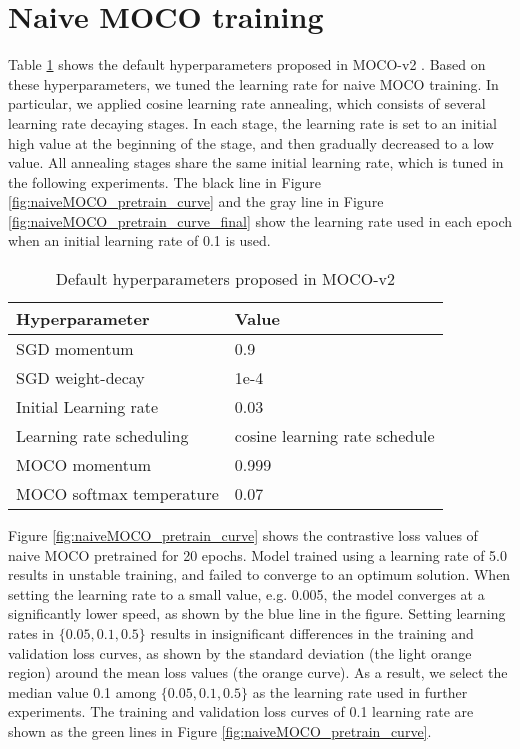 \documentclass[12pt,twoside]{report}
\begin{document}
\section{Naive MOCO training} \label{sec:naiveMOCO_eval}
Table \ref{tab:naive_moco_hyperparameters} shows the default hyperparameters proposed in MOCO-v2 \cite{mocov2}. Based on these hyperparameters, we tuned the learning rate for naive MOCO training. In particular, we applied cosine learning rate annealing, which consists of several learning rate decaying stages. In each stage, the learning rate is set to an initial high value at the beginning of the stage, and then gradually decreased to a low value. All annealing stages share the same initial learning rate, which is tuned in the following experiments. The black line in Figure \ref{fig:naiveMOCO_pretrain_curve} and the gray line in Figure \ref{fig:naiveMOCO_pretrain_curve_final} show the learning rate used in each epoch when an initial learning rate of 0.1 is used. \\

\begin{table}[]
    \centering
    \begin{tabular}{ll}
    \toprule
    Hyperparameter & Value \\
    \midrule
    SGD momentum & 0.9 \\
    SGD weight-decay & 1e-4 \\
    Initial Learning rate & 0.03 \\
    Learning rate scheduling & cosine learning rate schedule \\
    MOCO momentum & 0.999 \\
    MOCO softmax temperature & 0.07 \\
    \bottomrule
    \end{tabular}
    \caption{Default hyperparameters proposed in MOCO-v2}
    \label{tab:naive_moco_hyperparameters}
\end{table}

Figure \ref{fig:naiveMOCO_pretrain_curve} shows the contrastive loss values of naive MOCO pretrained for 20 epochs. Model trained using a learning rate of 5.0 results in unstable training, and failed to converge to an optimum solution. When setting the learning rate to a small value, e.g. 0.005, the model converges at a significantly lower speed, as shown by the blue line in the figure. Setting learning rates in $\{0.05, 0.1, 0.5\}$ results in insignificant differences in the training and validation loss curves, as shown by the standard deviation (the light orange region) around the mean loss values (the orange curve). As a result, we select the median value 0.1 among $\{0.05, 0.1, 0.5\}$ as the learning rate used in further experiments. The training and validation loss curves of 0.1 learning rate are shown as the green lines in Figure \ref{fig:naiveMOCO_pretrain_curve}. \\
\end{document}
